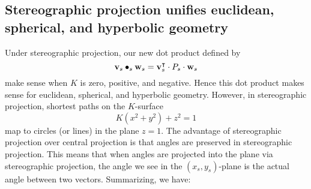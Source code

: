 \documentclass[newpage,handout,hints,12pt,noauthor,nooutcomes]{ximera}
\begin{document}
\subsection{Stereographic projection unifies euclidean, spherical, and hyperbolic geometry}


Under stereographic projection, our new dot product defined by
\[
\mathbf{v}_s\bullet_s \mathbf{w}_s = \mathbf{v}_s^\intercal \cdot P_s \cdot \mathbf{w}_s
\]
make sense when $K$ is zero, positive, and negative. Hence this dot
product makes sense for euclidean, spherical, and hyperbolic
geometry. However, in stereographic projection, shortest paths on the
$K$-surface
\[
K(x^2 + y^2) + z^2 = 1
\]
map to circles (or lines) in the plane $z=1$. The advantage of
stereographic projection over central projection is that angles are
preserved in stereographic projection. This means that when angles are
projected into the plane via stereographic projection, the angle we
see in the $(x_s,y_s)$-plane is the actual angle between two
vectors. Summarizing, we have:
\end{document}
